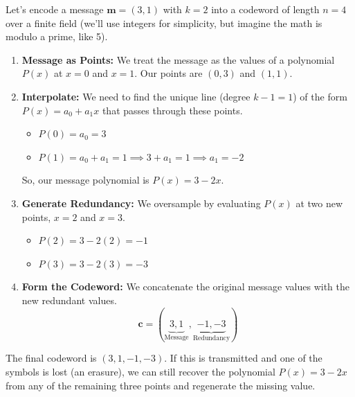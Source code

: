\documentclass{article}
\begin{document}
\begin{tcolorbox}[title={Example: Systematic RS Encoding}]
Let's encode a message $\mathbf{m}=(3, 1)$ with $k=2$ into a codeword of length $n=4$ over a finite field (we'll use integers for simplicity, but imagine the math is modulo a prime, like 5).
\begin{enumerate}
    \item \textbf{Message as Points:} We treat the message as the values of a polynomial $P(x)$ at $x=0$ and $x=1$. Our points are $(0, 3)$ and $(1, 1)$.
    \item \textbf{Interpolate:} We need to find the unique line (degree $k-1=1$) of the form $P(x) = a_0 + a_1 x$ that passes through these points.
    \begin{itemize}
        \item $P(0) = a_0 = 3$
        \item $P(1) = a_0 + a_1 = 1 \implies 3 + a_1 = 1 \implies a_1 = -2$
    \end{itemize}
    So, our message polynomial is $P(x) = 3 - 2x$.

    \item \textbf{Generate Redundancy:} We oversample by evaluating $P(x)$ at two new points, $x=2$ and $x=3$.
    \begin{itemize}
        \item $P(2) = 3 - 2(2) = -1$
        \item $P(3) = 3 - 2(3) = -3$
    \end{itemize}
    \item \textbf{Form the Codeword:} We concatenate the original message values with the new redundant values.
    \[ \mathbf{c} = (\underbrace{3, 1}_{\text{Message}}, \underbrace{-1, -3}_{\text{Redundancy}}) \]
\end{enumerate}
The final codeword is $(3, 1, -1, -3)$. If this is transmitted and one of the symbols is lost (an erasure), we can still recover the polynomial $P(x)=3-2x$ from any of the remaining three points and regenerate the missing value.
\end{tcolorbox}
\end{document}
